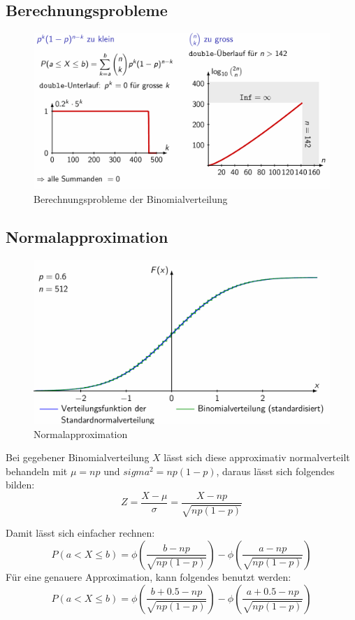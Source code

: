 \documentclass[../Main.tex]{subfiles}
\begin{document}
\subsection{Berechnungsprobleme}

\begin{figure}[H]
    \centering
    \includegraphics[width=0.75\linewidth]{Images/binom-berechnungsprobleme.png}
    \caption{Berechnungsprobleme der Binomialverteilung}
\end{figure}

\subsection{Normalapproximation}

\begin{figure}[H]
    \centering
    \includegraphics[width=0.75\linewidth]{Images/normalapproximation.png}
    \caption{Normalapproximation}
\end{figure}

Bei gegebener Binomialverteilung \(X\) lässt sich diese approximativ normalverteilt behandeln mit
\(\mu = np\) und \(sigma^2 = np (1-p)\), daraus lässt sich folgendes bilden:
\begin{equation}
    Z =  \frac{X-\mu}{\sigma} = \frac{X-np}{\sqrt{np(1-p)}}
\end{equation}

Damit lässt sich einfacher rechnen:
\begin{equation}
    P(a < X \leq b) = \phi(\frac{b-np}{\sqrt{np(1-p)}}) - \phi(\frac{a-np}{\sqrt{np(1-p)}})
\end{equation}
Für eine genauere Approximation, kann folgendes benutzt werden:
\begin{equation}
    P(a < X \leq b) = \phi(\frac{b+0.5-np}{\sqrt{np(1-p)}}) - \phi(\frac{a+0.5-np}{\sqrt{np(1-p)}})
\end{equation}
\end{document}

